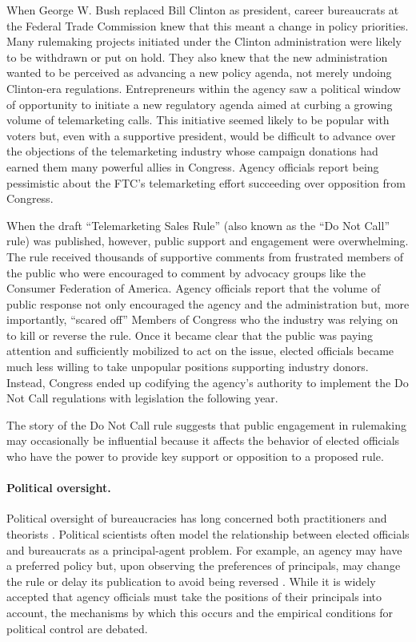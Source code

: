 When George W. Bush replaced Bill Clinton as president, career bureaucrats at the Federal Trade Commission knew that this meant a change in policy priorities. Many rulemaking projects initiated under the Clinton administration were likely to be withdrawn or put on hold. They also knew that the new administration wanted to be perceived as advancing a new policy agenda, not merely undoing Clinton-era regulations. Entrepreneurs within the agency saw a political window of opportunity to initiate a new regulatory agenda aimed at curbing a growing volume of telemarketing calls. This initiative seemed likely to be popular with voters but, even with a supportive president, would be difficult to advance over the objections of the telemarketing industry whose campaign donations had earned them many powerful allies in Congress. Agency officials report being pessimistic about the FTC's telemarketing effort succeeding over opposition from Congress.

When the draft ``Telemarketing Sales Rule'' (also known as the ``Do Not Call'' rule) was published, however, public support and engagement were overwhelming. The rule received thousands of supportive comments from frustrated members of the public who were encouraged to comment by advocacy groups like the Consumer Federation of America. Agency officials report that the volume of public response not only encouraged the agency and the administration but, more importantly, ``scared off'' Members of Congress who the industry was relying on to kill or reverse the rule. Once it became clear that the public was paying attention and sufficiently mobilized to act on the issue, elected officials became much less willing to take unpopular positions supporting industry donors. Instead, Congress ended up codifying the agency's authority to implement the Do Not Call regulations with legislation the following year.

The story of the Do Not Call rule suggests that public engagement in rulemaking may occasionally be influential because it affects the behavior of elected officials who have the power to provide key support or opposition to a proposed rule.


\paragraph{Political oversight.}
Political oversight of bureaucracies has long concerned both practitioners and theorists \citep{Wilson1989Epstein1999, Huber2002, McCubbins1984, Wilson1989, Potter2016, Lowande2018}. Political scientists often model the relationship between elected officials and bureaucrats as a principal-agent problem. For example, an agency may have a preferred policy but, upon observing the preferences of principals, may change the rule or delay its publication to avoid being reversed \citep{Potter2016}. While it is widely accepted that agency officials must take the positions of their principals into account, the mechanisms by which this occurs and the empirical conditions for political control are debated.


